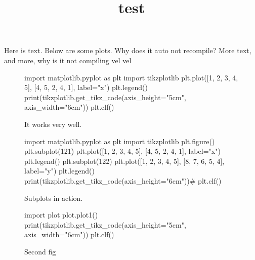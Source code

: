 \documentclass{article}
\title{test}
\begin{document}
\maketitle

Here is text. Below are some plots.
Why does it auto not recompile?
More text, and more, why is it not compiling
vel vel

\begin{figure}[h]
\centering
\begin{pycode}
import matplotlib.pyplot as plt
import tikzplotlib
plt.plot([1, 2, 3, 4, 5], [4, 5, 2, 4, 1], label="x")
plt.legend()
print(tikzplotlib.get_tikz_code(axis_height="5cm", axis_width="6cm"))
plt.clf()
\end{pycode}
\caption{It works very well.}
\end{figure}

\begin{figure}[h]
\centering
\begin{pycode}
import matplotlib.pyplot as plt
import tikzplotlib
plt.figure()
plt.subplot(121)
plt.plot([1, 2, 3, 4, 5], [4, 5, 2, 4, 1], label="x")
plt.legend()
plt.subplot(122)
plt.plot([1, 2, 3, 4, 5], [8, 7, 6, 5, 4], label="y")
plt.legend()
print(tikzplotlib.get_tikz_code(axis_height="6cm"))#%
plt.clf()
\end{pycode}
\caption{Subplots in action.}
\end{figure}

\begin{figure}
\centering
\begin{pycode}
import plot
plot.plot1()
print(tikzplotlib.get_tikz_code(axis_height="5cm", axis_width="6cm"))
plt.clf()
\end{pycode}
\caption{Second fig}
\end{figure}
\end{document}
